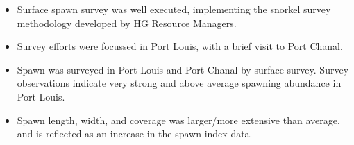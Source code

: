 \begin{itemize}
\item Surface spawn survey was well executed, implementing the snorkel survey methodology developed by HG Resource Managers.
\item Survey efforts were focussed in Port Louis, with a brief visit to Port Chanal.
\item Spawn was surveyed in Port Louis and Port Chanal by surface survey. 
Survey observations indicate very strong and above average spawning abundance in Port Louis.
\item Spawn length, width, and coverage was larger/more extensive than average, and is reflected as an increase in the spawn index data.
\end{itemize}
